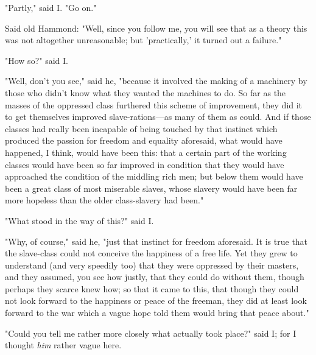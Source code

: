 "Partly," said I. "Go on."

Said old Hammond: "Well, since you follow me, you will see that as a
theory this was not altogether unreasonable; but 'practically,' it
turned out a failure."

"How so?" said I.

"Well, don't you see," said he, "because it involved the making of a
machinery by those who didn't know what they wanted the machines to do.
So far as the masses of the oppressed class furthered this scheme of
improvement, they did it to get themselves improved slave-rations---as
many of them as could. And if those classes had really been incapable of
being touched by that instinct which produced the passion for freedom
and equality aforesaid, what would have happened, I think, would have
been this: that a certain part of the working classes would have been so
far improved in condition that they would have approached the condition
of the middling rich men; but below them would have been a great class
of most miserable slaves, whose slavery would have been far more
hopeless than the older class-slavery had been."

"What stood in the way of this?" said I.

"Why, of course," said he, "just that instinct for freedom aforesaid. It
is true that the slave-class could not conceive the happiness of a free
life. Yet they grew to understand (and very speedily too) that they were
oppressed by their masters, and they assumed, you see how justly, that
they could do without them, though perhaps they scarce knew how; so that
it came to this, that though they could not look forward to the
happiness or peace of the freeman, they did at least look forward to the
war which a vague hope told them would bring that peace about."

"Could you tell me rather more closely what actually took place?" said
I; for I thought \emph{him} rather vague here.

